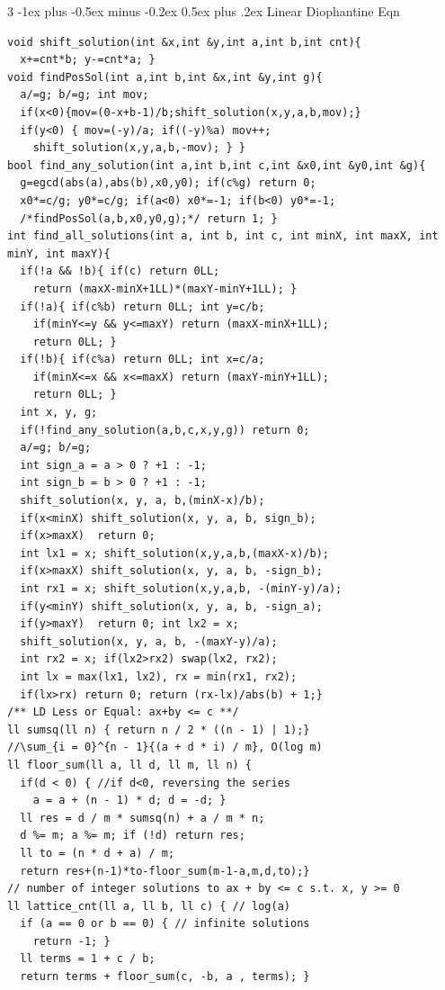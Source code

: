 \documentclass[8pt,a4paper,onesided]{article}
\makeatletter
\renewcommand{\subsection}{\@startsection{subsection}{2}{0mm}
    {-1ex plus -0.5ex minus -0.2ex} %
    {0.5ex plus .2ex}                %
    {\normalfont\large\bfseries}}    %
\makeatother
\begin{document}
\begin{multicols}{3}
\subsection{Linear Diophantine Eqn}
\begin{verbatim}
void shift_solution(int &x,int &y,int a,int b,int cnt){
  x+=cnt*b; y-=cnt*a; }
void findPosSol(int a,int b,int &x,int &y,int g){
  a/=g; b/=g; int mov;
  if(x<0){mov=(0-x+b-1)/b;shift_solution(x,y,a,b,mov);}
  if(y<0) { mov=(-y)/a; if((-y)%a) mov++;
    shift_solution(x,y,a,b,-mov); } }
bool find_any_solution(int a,int b,int c,int &x0,int &y0,int &g){
  g=egcd(abs(a),abs(b),x0,y0); if(c%g) return 0;
  x0*=c/g; y0*=c/g; if(a<0) x0*=-1; if(b<0) y0*=-1;
  /*findPosSol(a,b,x0,y0,g);*/ return 1; }
int find_all_solutions(int a, int b, int c, int minX, int maxX, int minY, int maxY){
  if(!a && !b){ if(c) return 0LL;
    return (maxX-minX+1LL)*(maxY-minY+1LL); }
  if(!a){ if(c%b) return 0LL; int y=c/b;
    if(minY<=y && y<=maxY) return (maxX-minX+1LL);
    return 0LL; }
  if(!b){ if(c%a) return 0LL; int x=c/a;
    if(minX<=x && x<=maxX) return (maxY-minY+1LL);
    return 0LL; }
  int x, y, g;
  if(!find_any_solution(a,b,c,x,y,g)) return 0;
  a/=g; b/=g;
  int sign_a = a > 0 ? +1 : -1;
  int sign_b = b > 0 ? +1 : -1;
  shift_solution(x, y, a, b,(minX-x)/b);
  if(x<minX) shift_solution(x, y, a, b, sign_b);
  if(x>maxX)  return 0;
  int lx1 = x; shift_solution(x,y,a,b,(maxX-x)/b);
  if(x>maxX) shift_solution(x, y, a, b, -sign_b);
  int rx1 = x; shift_solution(x,y,a,b, -(minY-y)/a);
  if(y<minY) shift_solution(x, y, a, b, -sign_a);
  if(y>maxY)  return 0; int lx2 = x;
  shift_solution(x, y, a, b, -(maxY-y)/a);
  int rx2 = x; if(lx2>rx2) swap(lx2, rx2);
  int lx = max(lx1, lx2), rx = min(rx1, rx2);
  if(lx>rx) return 0; return (rx-lx)/abs(b) + 1;}
/** LD Less or Equal: ax+by <= c **/
ll sumsq(ll n) { return n / 2 * ((n - 1) | 1);}
//\sum_{i = 0}^{n - 1}{(a + d * i) / m}, O(log m)
ll floor_sum(ll a, ll d, ll m, ll n) {
  if(d < 0) { //if d<0, reversing the series
    a = a + (n - 1) * d; d = -d; }
  ll res = d / m * sumsq(n) + a / m * n;
  d %= m; a %= m; if (!d) return res;
  ll to = (n * d + a) / m;
  return res+(n-1)*to-floor_sum(m-1-a,m,d,to);}
// number of integer solutions to ax + by <= c s.t. x, y >= 0
ll lattice_cnt(ll a, ll b, ll c) { // log(a)
  if (a == 0 or b == 0) { // infinite solutions
    return -1; }
  ll terms = 1 + c / b;
  return terms + floor_sum(c, -b, a , terms); }
\end{verbatim}

\end{multicols}
\end{document}

